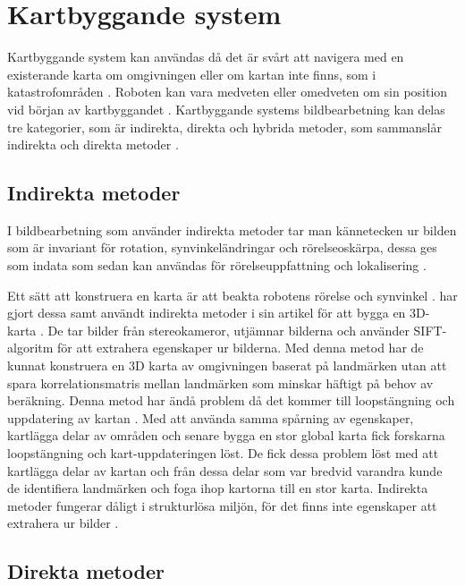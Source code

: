 \section{Kartbyggande system}

Kartbyggande system kan användas då det är svårt att navigera med en existerande karta om omgivningen eller om kartan inte finns, som i katastrofområden \citep{geospatial}. Roboten kan vara medveten eller omedveten om sin position vid början av kartbyggandet \citep{globalsubmaps}. Kartbyggande systems bildbearbetning kan delas tre kategorier, som är indirekta, direkta och hybrida metoder, som sammanslår indirekta och direkta metoder \citep{geospatial}.

\subsection{Indirekta metoder}

I bildbearbetning som använder indirekta metoder tar man kännetecken ur bilden som är invariant för rotation, synvinkeländringar och rörelseoskärpa, dessa ges som indata som sedan kan användas för rörelseuppfattning och lokalisering \citep{geospatial}. 

Ett sätt att konstruera en karta är att beakta robotens rörelse och synvinkel \citep{globalsubmaps}. \cite{mapbuildingsift} har gjort dessa samt användt indirekta metoder i sin artikel  för att bygga en 3D-karta \citep{mapbuildingsift}. De tar bilder från stereokameror, utjämnar bilderna och använder SIFT-algoritm för att extrahera egenskaper ur bilderna. Med denna metod har de kunnat konstruera en 3D karta av omgivningen baserat på landmärken utan att spara korrelationsmatris mellan landmärken som minskar häftigt på behov av beräkning. Denna metod har ändå problem då det kommer till loopstängning och uppdatering av kartan \citep{globalsubmaps}. Med att använda samma spårning av egenskaper, kartlägga delar av områden och senare bygga en stor global karta fick forskarna loopstängning och kart-uppdateringen löst. De fick dessa problem löst med att kartlägga delar av kartan och från dessa delar som var bredvid varandra kunde de identifiera landmärken och foga ihop kartorna till en stor karta. Indirekta metoder fungerar dåligt i strukturlösa miljön, för det finns inte egenskaper att extrahera ur bilder \citep{geospatial}.

\subsection{Direkta metoder}

